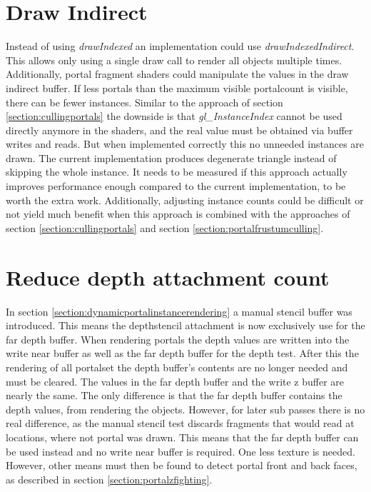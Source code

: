 \section{Draw Indirect}
Instead of using \textit{drawIndexed} an implementation could use \textit{drawIndexedIndirect}. This allows only using a single draw call to render all objects multiple times. Additionally, portal fragment shaders could manipulate the values in the draw indirect buffer. If less portals than the maximum visible \gls{portalcount} is visible, there can be fewer instances. Similar to the approach of section \ref{section:cullingportals} the downside is that \textit{gl\_InstanceIndex} cannot be used directly anymore in the shaders, and the real value must be obtained via buffer writes and reads. But when implemented correctly this no unneeded instances are drawn. The current implementation produces degenerate triangle instead of skipping the whole instance. It needs to be measured if this approach actually improves performance enough compared to the current implementation, to be worth the extra work. Additionally, adjusting instance counts could be difficult or not yield much benefit when this approach is combined with the approaches of section \ref{section:cullingportals} and section \ref{section:portalfrustumculling}.

\section{Reduce depth attachment count}

In section \ref{section:dynamicportalinstancerendering} a manual stencil buffer was introduced. This means the depthstencil attachment is now exclusively use for the far depth buffer. When rendering portals the depth values are written into the write near buffer as well as the far depth buffer for the depth test. After this the rendering of all \gls{portalset} the depth buffer's contents are no longer needed and must be cleared. The values in the far depth buffer and the write z buffer are nearly the same. The only difference is that the far depth buffer contains the depth values, from rendering the objects. However, for later sub passes there is no real difference, as the manual stencil test discards fragments that would read at locations, where not portal was drawn. This means that the far depth buffer can be used instead and no write near buffer is required. One less texture is needed. However, other means must then be found to detect portal front and back faces, as described in section \ref{section:portalzfighting}.

